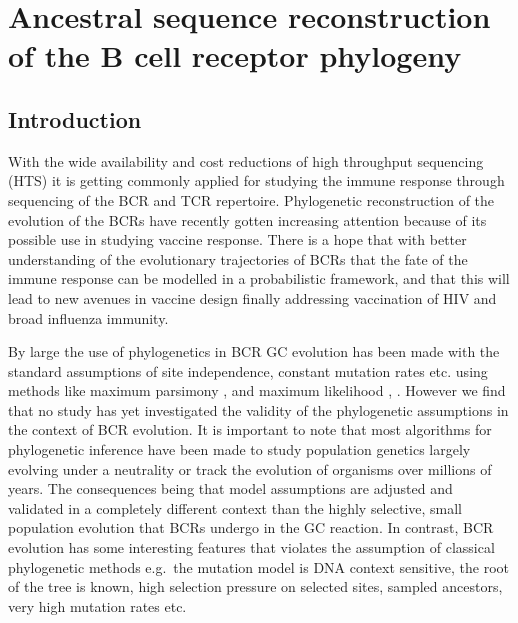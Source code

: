 \chapter{Ancestral sequence reconstruction of the B cell receptor phylogeny}

\section{Introduction}
With the wide availability and cost reductions of high throughput sequencing (HTS) it is getting commonly applied for studying the immune response through sequencing of the BCR and TCR repertoire.
Phylogenetic reconstruction of the evolution of the BCRs have recently gotten increasing attention because of its possible use in studying vaccine response.
There is a hope that with better understanding of the evolutionary trajectories of BCRs that the fate of the immune response can be modelled in a probabilistic framework, and that this will lead to new avenues in vaccine design finally addressing vaccination of HIV and broad influenza immunity.

By large the use of phylogenetics in BCR GC evolution has been made with the standard assumptions of site independence, constant mutation rates etc. using methods like maximum parsimony \cite{tas2016visualizing}, \cite{Barak2008-fw} and maximum likelihood \cite{Doria-Rose2014-vi}, \cite{Hoehn2016-wg}.
However we find that no study has yet investigated the validity of the phylogenetic assumptions in the context of BCR evolution.
It is important to note that most algorithms for phylogenetic inference have been made to study population genetics largely evolving under a neutrality or track the evolution of organisms over millions of years.
The consequences being that model assumptions are adjusted and validated in a completely different context than the highly selective, small population evolution that BCRs undergo in the GC reaction.
In contrast, BCR evolution has some interesting features that violates the assumption of classical phylogenetic methods e.g.\ the mutation model is DNA context sensitive, the root of the tree is known, high selection pressure on selected sites, sampled ancestors, very high mutation rates etc.


